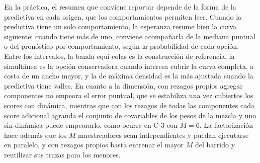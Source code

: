 En la práctica, el resumen que conviene reportar depende de la forma de la predictiva en cada origen, que los comportamientos permiten leer. Cuando la predictiva tiene un solo comportamiento, la esperanza resume bien la curva siguiente; cuando tiene más de uno, conviene acompañarla de la mediana puntual o del pronóstico por comportamiento, según la probabilidad de cada opción. Entre los intervalos, la banda equi-colas es la construcción de referencia, la simultánea es la opción conservadora cuando interesa cubrir la curva completa, a costa de un ancho mayor, y la de máxima densidad es la más ajustada cuando la predictiva tiene valles. En cuanto a la dimensión, con rezagos propios agregar componentes no empeora el error puntual, que se estabiliza una vez cubiertos los scores con dinámica, mientras que con los rezagos de todas las componentes cada score adicional agranda el conjunto de covariables de los pesos de la mezcla y uno sin dinámica puede empeorarlo, como ocurre en C-3 con $M = 6$. La factorización hace además que los $M$ muestreadores sean independientes y puedan ejecutarse en paralelo, y con rezagos propios basta entrenar el mayor $M$ del barrido y reutilizar sus trazas para los menores.










